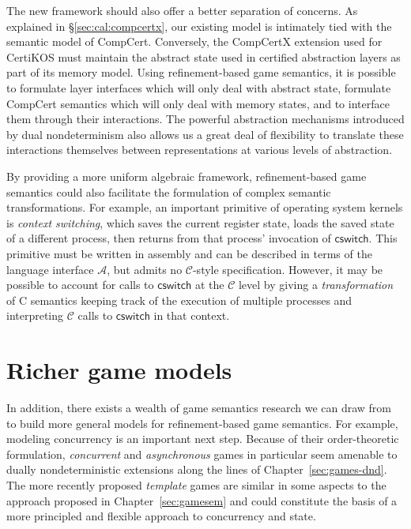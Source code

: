 \documentclass[11pt,oneside]{book}
\theoremstyle{definition}
\newcommand{\kw}[1]{\ensuremath{ \mathsf{#1} }}
\begin{document}
The new framework should also offer
a better separation of concerns.
As explained in \S\ref{sec:cal:compcertx},
our existing model
is intimately tied with the semantic model of CompCert.
Conversely,
the CompCertX extension used for CertiKOS
must maintain the abstract state used in certified abstraction layers
as part of its memory model.
Using refinement-based game semantics,
it is possible to formulate layer interfaces
which will only deal with abstract state,
formulate CompCert semantics which will only deal
with memory states,
and to interface them through their interactions.
The powerful abstraction mechanisms
introduced by dual nondeterminism
also allows us a great deal of flexibility
to translate these interactions themselves
between representations at various levels of abstraction.

By providing a more uniform algebraic framework,
refinement-based game semantics could also facilitate
the formulation of complex semantic transformations.
For example,
an important primitive of operating system kernels
is \emph{context switching},
which saves the current register state,
loads the saved state of a different process,
then returns from that process' invocation of \kw{cswitch}.
This primitive must be written in assembly
and can be described in terms of the language interface $\mathcal{A}$,
but admits no $\mathcal{C}$-style specification.
However,
it may be possible to account for calls to \kw{cswitch}
at the $\mathcal{C}$ level
by giving a \emph{transformation} of C semantics
keeping track of the execution of multiple processes
and interpreting $\mathcal{C}$ calls to \kw{cswitch}
in that context.


\section{Richer game models} %

In addition,
there exists a wealth of game semantics research
we can draw from to build
more general models for refinement-based game semantics.
For example,
modeling concurrency is an important next step.
Because of their order-theoretic formulation,
\emph{concurrent} and \emph{asynchronous} games \citep{cgames,agames2}
in particular seem amenable to dually nondeterministic extensions
along the lines of Chapter~\ref{sec:games-dnd}.
The more recently proposed
\emph{template} games \citep{tgames}
are similar in some aspects
to the approach proposed in Chapter~\ref{sec:gamesem}
and could constitute the basis of
a more principled and flexible approach
to concurrency and state.
\end{document}
